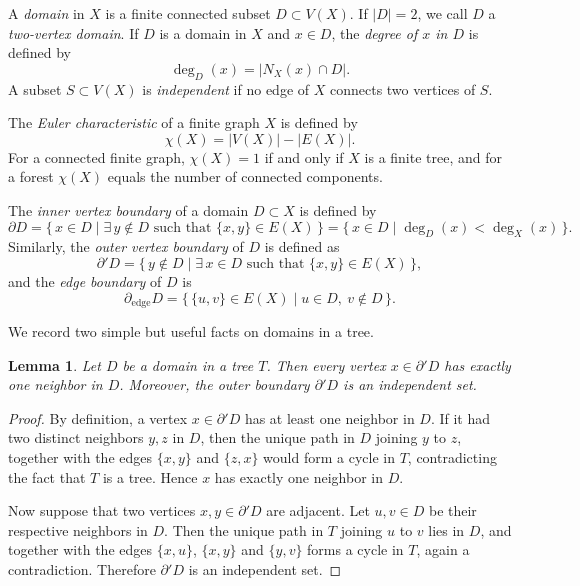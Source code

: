 \documentclass[a4paper, 11pt]{article}
\numberwithin{equation}{section}
\newtheorem{lemma}[theorem]{Lemma}
\theoremstyle{definition}
\theoremstyle{remark}
\begin{document}
\smallskip 

A \emph{domain} in $X$ is a finite connected subset $D\subset V(X)$.
If $|D|=2$, we call $D$ a \emph{two-vertex domain}.
If $D$ is a domain in $X$ and $x\in D$, the \emph{degree of $x$ in $D$} is defined by
\[
   \deg_D(x) = |N_X(x)\cap D|.
\]
A subset $S\subset V(X)$ is \emph{independent} if no edge of $X$ connects two vertices of $S$.


\smallskip

The \emph{Euler characteristic} of a finite graph $X$ is defined by
\[
   \chi(X)=|V(X)|-|E(X)|.
\]
For a connected finite graph, $\chi(X)=1$ if and only if $X$ is a finite tree, and for a forest $\chi(X)$ equals the number of connected components.

\smallskip

The \emph{inner vertex boundary} of a domain $D\subset X$ is defined by
\[
\partial D = \bigl\{\, x\in D \mid \exists\, y\notin D \text{ such that } \{x,y\}\in E(X) \,\bigr\}
= \bigl\{\, x\in D \mid \deg_D(x)<\deg_X(x) \,\bigr\}.
\]
Similarly, the \emph{outer vertex boundary} of $D$ is defined as
\[
\partial' D = \bigl\{\, y\notin D \mid \exists\, x\in D \text{ such that } \{x,y\}\in E(X) \,\bigr\},
\]
and the \emph{edge boundary} of $D$ is
\[
\partial_{\mathrm{edge}} D = \bigl\{\, \{u,v\}\in E(X) \mid  u\in D,\ v\notin D \,\bigr\}.
\]

We record two simple but useful facts on domains in a tree.

\begin{lemma}\label{lem:outer-boundary-tree}
Let $D$ be a domain in a tree $T$. Then every vertex $x\in \partial' D$ has exactly one neighbor in $D$.
Moreover, the outer boundary $\partial' D$ is an independent set.
\end{lemma}

\begin{proof}
By definition,  a vertex $x\in \partial' D$ has at least one neighbor in $D$.
If it had two distinct neighbors $y,z$ in $D$, then the unique path in $D$
joining $y$ to $z$, together with the edges $\{x,y\}$ and $\{z,x\}$ would form a cycle in $T$, contradicting the fact that
$T$ is a tree. Hence $x$ has exactly one neighbor in $D$.

\smallskip

Now suppose that two vertices $x,y \in \partial' D$ are adjacent. Let $u,v \in D$ be their respective neighbors in $D$. 
Then the unique path in $T$ joining $u$ to $v$ lies in $D$, and together with the edges $\{x,u\}$, $\{x,y\}$ and $\{y,v\}$ forms a cycle in $T$, again a contradiction. Therefore $\partial' D$ is an independent set.
\end{proof}
\end{document}
